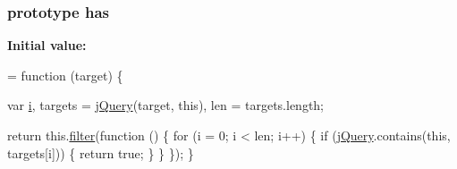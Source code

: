 \subsubsection[{\texorpdfstring{has}{has}}]{ {\bf prototype} has}\hypertarget{jquery-2_82_81-vsdoc_8js_a3976525435f2cc0ddbdfd1fd4fa719ec}{}\label{jquery-2_82_81-vsdoc_8js_a3976525435f2cc0ddbdfd1fd4fa719ec}
{\bfseries Initial value\+:}
\begin{DoxyCode}
= \textcolor{keyword}{function} (target) \{
        

        var \hyperlink{geolocation-marker_8js_a0325b7ce0988782a8032e720ef3aa411}{i},
            targets = \hyperlink{jquery-2_82_81-vsdoc_8js_add5237586d970a38a81f990e8eb28c6c}{jQuery}(target, \textcolor{keyword}{this}),
            len = targets.length;

        \textcolor{keywordflow}{return} this.\hyperlink{jquery-2_82_81-vsdoc_8js_ac99d0cf56cab46114f5765a14e03ad6d}{filter}(\textcolor{keyword}{function} () \{
            \textcolor{keywordflow}{for} (i = 0; i < len; i++) \{
                \textcolor{keywordflow}{if} (\hyperlink{jquery-2_82_81-vsdoc_8js_add5237586d970a38a81f990e8eb28c6c}{jQuery}.contains(\textcolor{keyword}{this}, targets[i])) \{
                    \textcolor{keywordflow}{return} \textcolor{keyword}{true};
                \}
            \}
        \});
    \}
\end{DoxyCode}
